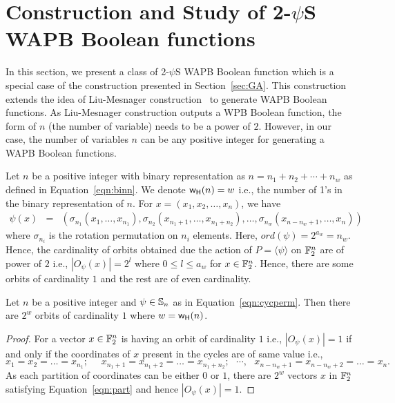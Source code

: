 \documentclass{llncs}
\begin{document}
\section{Construction and Study of 2-$\psi$S WAPB Boolean functions}\label{sec:ELM}
In this section, we present a class of 2-$\psi$S WAPB Boolean function which is a special case of the construction presented in Section~\ref{sec:GA}. This construction extends the idea of Liu-Mesnager construction~\cite{DCC:LiuMes19} to generate WAPB Boolean functions. As Liu-Mesnager construction outputs a WPB Boolean function, the form of $n$ (the number of variable) needs to be a power of $2$. However, in our case, the number of variables $n$ can be any positive integer for generating a WAPB Boolean functions.

Let $n$ be a positive integer with binary representation as
$n =  n_1 + n_2 + \cdots + n_w$ as defined in Equation~\ref{eqn:binn}.
We denote $\mathsf{w_H}(n) = w$ i.e., the number of 1's in the binary representation of $n$.
For $x = (x_1, x_2, \ldots, x_n)$, we have
\begin{eqnarray}\label{eqn:cycperm1}
\psi(x) & = & (\sigma_{n_1}(x_1,\ldots,x_{n_1}), \sigma_{n_2}(x_{n_1+1},\ldots,x_{n_1+n_2}), \ldots, \sigma_{n_w}(x_{n-n_w+1},\ldots,x_n))
\end{eqnarray}
where $\sigma_{n_i}$ is the rotation permutation on $n_i$ elements.
Here, $ord(\psi) = 2^{a_w} = n_w$. Hence, the cardinality of orbits obtained due the action of $P = \langle \psi \rangle$ on $\mathbb{F}_2^n$ are of power of $2$ i.e., $|O_\psi(x)| = 2^l$ where $0 \leq l \leq a_w$ for $x \in \mathbb{F}_2^n$.
Hence, there are some orbits of cardinality $1$ and the rest are of even cardinality. 
\begin{lemma}\label{lem:orbNo}
Let $n$ be a positive integer and $\psi \in \mathbb{S}_n$ as in Equation~\ref{eqn:cycperm}. Then there are $2^w$ orbits of cardinality $1$ where $w = \mathsf{w_H}(n)$.
\end{lemma}
\begin{proof}
For a vector $x \in \mathbb{F}_2^n$ is having an orbit of cardinality $1$ i.e., $|O_\psi(x)| = 1$ if and only if the coordinates of $x$ present in the cycles are of same value i.e., 
\begin{equation}\label{eqn:part}
x_1  = x_2 = \ldots = x_{n_1}; ~~~~~~ x_{n_1+1}  = x_{n_1+2} = \ldots = x_{n_1+n_2}; ~~~ \cdots, ~~~ x_{n-n_w+1}  = x_{n-n_w+2} = \ldots = x_n.
\end{equation}
As each partition of coordinates can be either $0$ or $1$, there are $2^w$ vectors $x$ in $\mathbb{F}_2^n$ satisfying Equation~\ref{eqn:part} and hence $|O_\psi(x)| = 1$.
\end{proof}
\end{document}
